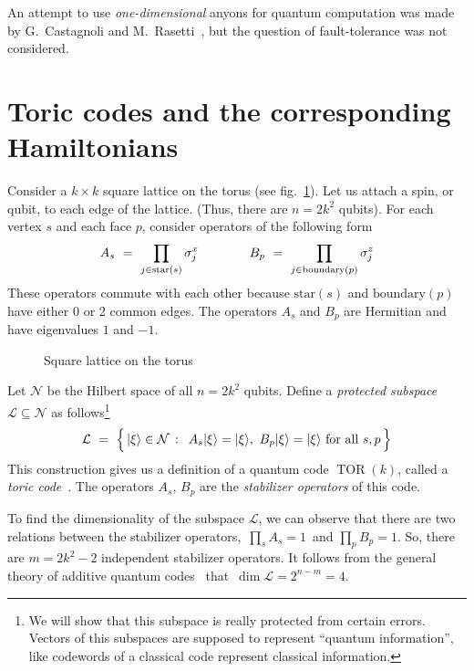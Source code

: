 \documentclass[12pt]{article}
\newcommand*{\epsfscale}[1]{\def\epsfsize##1##2{#1##1}}
\newcommand{\TOR}{\mathop\mathrm{TOR}\nolimits}
\newcommand{\calL}{\mathcal{L}}
\newcommand{\calN}{\mathcal{N}}
\begin{document}
An attempt to use \emph{one-dimensional} anyons for quantum computation was
made by G.~Castagnoli and M.~Rasetti~\cite{CaRa}, but the question of 
fault-tolerance was not considered.


\section{Toric codes and the corresponding Hamiltonians} \label{sec_torcodes}

Consider a $k\times k$ square lattice on the torus (see 
fig.~\ref{fig_sqlatt}). Let us attach a spin, or qubit, to each edge of 
the lattice. (Thus, there are $n=2k^2$ qubits). For each vertex $s$ and each 
face $p$, consider operators of the following form
\begin{equation} \label{stabop}
  A_s\ =\ \prod_{j\in\mbox{\scriptsize star}(s)}\sigma^x_j  \qquad\qquad  
  B_p\ =\ \prod_{j\in\mbox{\scriptsize boundary}(p)}\sigma^z_j
\end{equation} 
These operators commute with each other because $\mbox{star}(s)$ and 
$\mbox{boundary}(p)$ have either 0 or 2 common edges. The operators $A_s$ 
and $B_p$ are Hermitian and have eigenvalues $1$ and $-1$. 

\begin{figure}[t]
\centerline{\epsfscale{0.6}}
\caption{Square lattice on the torus}
\label{fig_sqlatt}
\end{figure}

Let $\calN$ be the Hilbert space of all $n=2k^2$ qubits. Define a 
\emph{protected subspace} $\calL\subseteq\calN$ as follows\footnote{
 We will show that this subspace is really protected from certain errors.
 Vectors of this subspaces are supposed to represent ``quantum 
 information'', like codewords of a classical code represent classical 
 information.}
\begin{equation} \label{infspace}
  \calL\ =\ \Bigl\{\, |\xi\rangle\in\calN\,:\,\  
  A_s|\xi\rangle=|\xi\rangle,\ B_p|\xi\rangle=|\xi\rangle\ \mbox{for all}\ s,p
  \,\Bigr\}
\end{equation}
This construction gives us a definition of a quantum code 
$\TOR(k)$, called a \emph{toric code}~\cite{Kit1,Kit2}. 
The operators $A_s$, $B_p$ are the \emph{stabilizer operators} of this code.

To find the dimensionality of the subspace $\calL$, we can observe that there 
are two relations between the stabilizer operators,\, $\prod_s A_s=1$\, and 
$\prod_p B_p=1$. So, there are $m=2k^2-2$ independent stabilizer operators. 
It follows from the general theory of additive quantum codes~\cite{Got,CRSS} 
that\, $\dim\calL=2^{n-m}=4$.
\end{document}
